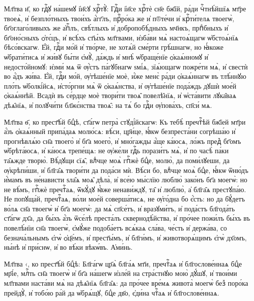 \documentclass[20pt]{extarticle}
\begin{document}
Мл҃тва и҃, ко гдⷭ҇ꙋ на́шемꙋ і҆и҃сꙋ хрⷭ҇тꙋ̀:
Гдⷭ҇и і҆и҃се хрⷭ҇тѐ сн҃е бж҃їй, ра́ди чⷭ҇тнѣ́йшїѧ мт҃ре твоеѧ̀, и҆ безпло́тныхъ твои́хъ а҆́гг҃лъ, прⷪ҇ро́ка же и҆ п®те́чи и҆ крⷭ҇ти́телѧ твоегѡ̀, бг҃оглаго́ливыхъ же а҆пⷭ҇лъ, свѣ́тлыхъ и҆ добропобѣ́дныхъ мч҃нкъ, прпⷣбныхъ и҆ бг҃оно́сныхъ ѻ҆тє́цъ, и҆ всѣ́хъ ст҃ы́хъ мл҃твами, и҆зба́ви мѧ̀ настоѧ́щагѡ ѡ҆бстоѧ́нїѧ бѣсо́вскагѡ. Е҆́й, гдⷭ҇и мо́й и҆ тво́рче, не хотѧ́й сме́рти грѣ́шнагѡ, но ꙗ҆́коже ѡ҆брати́тисѧ и҆ жи́вꙋ бы́ти є҆мꙋ̀, да́ждь и҆ мнѣ̀ ѡ҆браще́нїе ѻ҆каѧ́нномꙋ и҆ недосто́йномꙋ: и҆зми́ мѧ ѿ ѹ҆́стъ па́гꙋбнагѡ ѕмі́ѧ, зїѧ́ющагѡ пожре́ти мѧ̀, и҆ свестѝ во а҆́дъ жи́ва. Е҆́й, гдⷭ҇и мо́й, ѹ҆тѣше́нїе моѐ, и҆́же менє̀ ра́ди ѻ҆каѧ́ннагѡ въ тлѣ́ннꙋю пло́ть ѡ҆болкі́йсѧ, и҆сто́ргни мѧ̀ ѿ ѻ҆каѧ́нства, и҆ ѹ҆тѣше́нїе пода́ждь дꙋшѝ мое́й ѻ҆каѧ́ннѣй. Всадѝ въ се́рдце моѐ твори́ти твоѧ̑ повелѣ̑нїѧ, и҆ ѡ҆ста́вити лꙋка̑ваѧ дѣѧ̑нїѧ, и҆ полꙋчи́ти бл҃жє́нства твоѧ̑: на тѧ́ бо гдⷭ҇и ѹ҆пова́хъ, сп҃си́ мѧ.

Мл҃тва ѳ҃, ко прест҃ѣ́й бцⷣѣ,
ст҃а́гѡ петра̀ стꙋді́йскагѡ:
Къ тебѣ̀ пречтⷭ҇ѣй бж҃їей мт҃ри а҆́зъ ѻ҆каѧ́нный припа́даѧ молю́сѧ: вѣ́си, цр҃и́це, ꙗ҆́кѡ безпреста́ни согрѣша́ю и҆ прогнѣвлѧ́ю сн҃а твоего̀ и҆ бг҃а моего̀, и҆ мно́гажды а҆́ще ка́юсѧ, ло́жъ пред꙽ бг҃омъ ѡ҆брѣта́юсѧ, и҆ ка́юсѧ трепе́щѧ: не ѹ҆же́ли гдⷭ҇ь порази́тъ мѧ̀, и҆ по часѣ̀ па́ки та̑ѧжде творю̀. Вѣ́дꙋщи сїѧ̑, влⷣчце моѧ̀ гпⷭ҇жѐ бцⷣе, молю̀, да поми́лꙋеши, да ѹ҆крѣпи́ши, и҆ бл҃га̑ѧ твори́ти да пода́си мѝ. Вѣ́си бо, влⷣчце моѧ̀ бцⷣе, ꙗ҆́кѡ ѿню́дъ и҆́мамъ въ не́нависти ѕла̑ѧ моѧ̑ дѣла̀, и҆ все́ю мы́слїю люблю̀ зако́нъ бг҃а моегѡ̀: но не вѣ́мъ, гпⷭ҇жѐ пречтⷭ҇аѧ, ѿкꙋ́дꙋ ꙗ҆̀же ненави́ждꙋ, та̑ и҆ люблю̀, а҆ бл҃га̑ѧ престꙋпа́ю. Не попꙋща́й, пречтⷭ҇аѧ, во́ли мое́й соверша́тисѧ, не ѹ҆го́дна бо є҆́сть: но да бꙋ́детъ во́лѧ сн҃а твоегѡ̀ и҆ бг҃а моегѡ̀: да мѧ̀ сп҃се́тъ, и҆ вразꙋми́тъ, и҆ пода́стъ бл҃года́ть ст҃а́гѡ дх҃а, да бы́хъ а҆́зъ ѿсе́лѣ преста́лъ сквернодѣ́йства, и҆ про́чее пожи́лъ бы́хъ въ повелѣ́нїи сн҃а твоегѡ̀, є҆мꙋ́же подоба́етъ всѧ́каѧ сла́ва, че́сть и҆ держа́ва, со безнача́льнымъ є҆гѡ̀ ѻ҆ц҃е́мъ, и҆ прест҃ы́мъ, и҆ бл҃ги́мъ, и҆ животворѧ́щимъ є҆гѡ̀ дх҃омъ, ны́нѣ и҆ при́снѡ, и҆ во вѣ́ки вѣкѡ́въ. А҆ми́нь.

Мл҃тва ‹, ко прест҃ѣ́й бцⷣѣ:
Бл҃га́гѡ цр҃ѧ̀ бл҃га́ѧ мт҃и, пречтⷭ҇аѧ и҆ бл҃гослове́ннаѧ бцⷣе мр҃і́е, млⷭ҇ть сн҃а твоегѡ̀ и҆ бг҃а на́шегѡ и҆зле́й на стра́стнꙋю мою̀ дꙋ́шꙋ, и҆ твои́ми мл҃твами наста́ви мѧ̀ на дѣѧ̑нїѧ бл҃га̑ѧ: да про́чее вре́мѧ живота̀ моегѡ̀ без꙽ поро́ка прейдꙋ̀, и҆ тобо́ю ра́й да ѡ҆брѧ́щꙋ, бцⷣе дв҃о, є҆ди́на чтⷭ҇аѧ и҆ бл҃гослове́ннаѧ.
\end{document}
